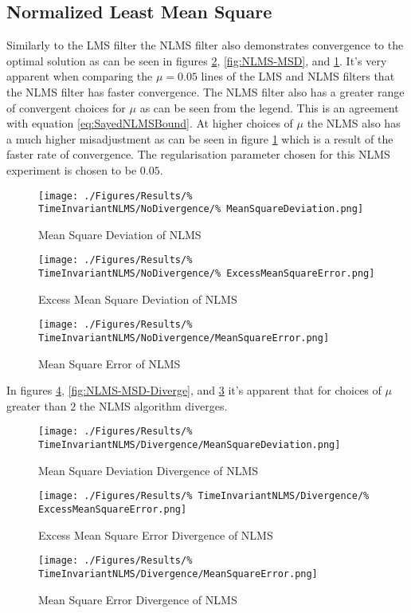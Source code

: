 \subsection{Normalized Least Mean Square}
\FloatBarrier
Similarly to the LMS filter the NLMS filter also demonstrates %
convergence to the optimal solution as can be %
seen in figures \ref{fig:NLMS-MSE}, \ref{fig:NLMS-MSD}, %
and \ref{fig:NLMS-EMSE}. It's very apparent when %
comparing the $\mu = 0.05$ lines of the LMS and NLMS filters %
that the NLMS filter has faster convergence. The NLMS filter %
also has a greater range of convergent choices for %
$\mu$ as can be seen from the legend. This is an agreement %
with equation \ref{eq:SayedNLMSBound}. At higher choices of %
$\mu$ the NLMS also has a much higher misadjustment as can be %
seen in figure \ref{fig:NLMS-EMSE} which is a result of the %
faster rate of convergence. The regularisation parameter chosen %
for this NLMS experiment is chosen to be $0.05$.
\begin{figure}[ht]
	\centering
	\begin{minipage}{0.49\textwidth}
		\texttt{[image: ./Figures/Results/\%
		TimeInvariantNLMS/NoDivergence/\%
		MeanSquareDeviation.png]}
		\caption{Mean Square Deviation of NLMS}
		\label{fig:NLMS-MSD}
	\end{minipage}
	\begin{minipage}{0.49\textwidth}
		\texttt{[image: ./Figures/Results/\%
		TimeInvariantNLMS/NoDivergence/\%
		ExcessMeanSquareError.png]}
		\caption{Excess Mean Square Deviation of NLMS}
		\label{fig:NLMS-EMSE}
	\end{minipage}
\end{figure}
\begin{figure}[ht]
	\centering
	\texttt{[image: ./Figures/Results/\%
	TimeInvariantNLMS/NoDivergence/MeanSquareError.png]}
	\caption{Mean Square Error of NLMS}
	\label{fig:NLMS-MSE}
\end{figure}
In figures \ref{fig:NLMS-MSE-Diverge}, \ref{fig:NLMS-MSD-Diverge}, %
and \ref{fig:NLMS-EMSE-Diverge} it's apparent that %
for choices of $\mu$ greater than $2$ the NLMS algorithm diverges.
\begin{figure}[ht]
	\centering
	\begin{minipage}{0.49\textwidth}
		\centering
		\texttt{[image: ./Figures/Results/\%
		TimeInvariantNLMS/Divergence/MeanSquareDeviation.png]}
		\caption{Mean Square Deviation Divergence of NLMS}
		\label{fig:NLMS-MSD-Diverge}
	\end{minipage}
	\begin{minipage}{0.49\textwidth}
		\centering
		\texttt{[image: ./Figures/Results/\%
		TimeInvariantNLMS/Divergence/\%
		ExcessMeanSquareError.png]}
		\caption{Excess Mean Square Error Divergence of NLMS}
		\label{fig:NLMS-EMSE-Diverge}
	\end{minipage}
\end{figure}
\begin{figure}[ht]
	\centering
	\texttt{[image: ./Figures/Results/\%
	TimeInvariantNLMS/Divergence/MeanSquareError.png]}
	\caption{Mean Square Error Divergence of NLMS}
	\label{fig:NLMS-MSE-Diverge}
\end{figure}

